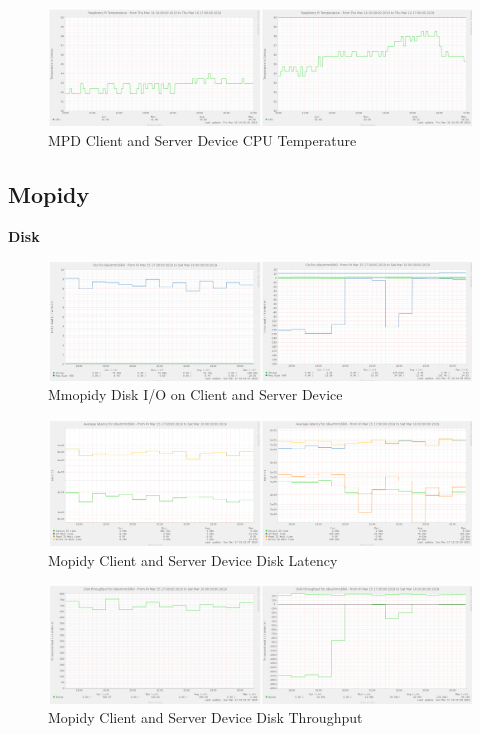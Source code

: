 \documentclass[11pt,a4paper]{scrreprt}
\begin{document}
\begin{figure}[H]
\includegraphics{ResultsAndAnalysis/MPDServerTestImages/003MPDCPUTemp.png}
\centering
\caption{MPD Client and Server Device CPU Temperature}
\label{MPDCPUTemp}
\end{figure}

\subsection{Mopidy}\label{mopidy-2}

\textbf{Disk}

\begin{figure}[H]
\includegraphics{ResultsAndAnalysis/MopidyServerTestImages/005MopidyDiskIO.png}
\centering
\caption{Mmopidy Disk I/O on Client and Server Device}
\label{MopidyDiskIO}
\end{figure}

\begin{figure}[H]
\includegraphics{ResultsAndAnalysis/MopidyServerTestImages/006MopidyDiskLatency.png}
\centering
\caption{Mopidy Client and Server Device Disk Latency}
\label{MopidyDiskLatency}
\end{figure}

\begin{figure}[H]
\includegraphics{ResultsAndAnalysis/MopidyServerTestImages/007MopidyDiskThroughput.png}
\centering
\caption{Mopidy Client and Server Device Disk Throughput}
\label{MopidyDiskThroughput}
\end{figure}
\end{document}
